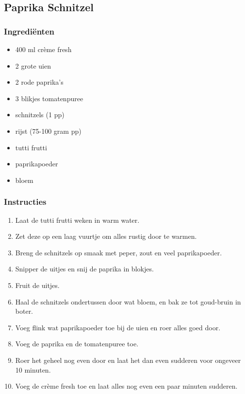 \subsection{Paprika Schnitzel}
\subsubsection*{Ingrediënten}
\begin{multicols}{2}
    \begin{itemize}
        \item 400 ml crème fresh
        \item 2 grote uien
        \item 2 rode paprika's 
        \item 3 blikjes tomatenpuree
        \item schnitzels (1 pp)
        \item rijst (75-100 gram pp)
        \item tutti frutti
        \item paprikapoeder
        \item bloem
    \end{itemize}
\end{multicols}

\subsubsection*{Instructies}
\begin{multicols}{2}
    \begin{enumerate}
        \item Laat de tutti frutti weken in warm water.
        \item Zet deze op een laag vuurtje om alles rustig door te warmen.
        \item Breng de schnitzels op smaak met peper, zout en veel paprikapoeder.
        \item Snipper de uitjes en snij de paprika in blokjes.
        \item Fruit de uitjes.
        \item Haal de schnitzels ondertussen door wat bloem, en bak ze tot goud-bruin in boter.
        \item Voeg flink wat paprikapoeder toe bij de uien en roer alles goed door.
        \item Voeg de paprika en de tomatenpuree toe.
        \item Roer het geheel nog even door en laat het dan even sudderen voor ongeveer 10 minuten.
        \item Voeg de crème fresh toe en laat alles nog even een paar minuten sudderen.
    \end{enumerate}
\end{multicols}
